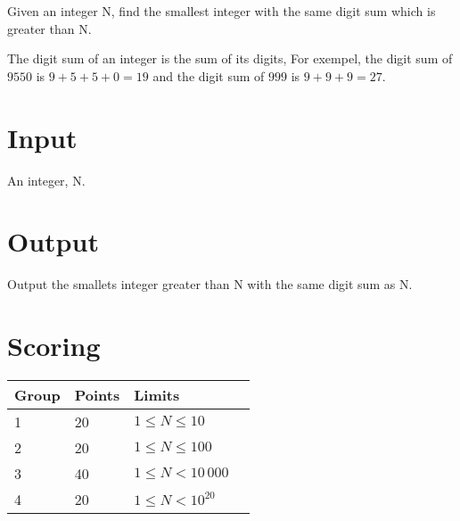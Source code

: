 
Given an integer N, find the smallest integer with the same digit sum which is greater than N.

The digit sum of an integer is the sum of its digits, For exempel, the digit sum of $9550$ is $9 + 5 + 5 + 0 = 19$ and the digit sum of $999$ is $9 + 9 + 9 = 27$.

\section*{Input}
An integer, N.

\section*{Output}
Output the smallets integer greater than N with the same digit sum as N.

\section*{Scoring}

\begin{tabular}{| l | l | l | l |}
\hline
Group & Points     & Limits \\ \hline
1     & 20         & $1 \le N \le 10$ \\ \hline	
2     & 20         & $1 \le N \le 100$ \\ \hline	
3     & 40         & $1 \le N < 10\,000$ \\ \hline	
4     & 20         & $1 \le N < 10^{20}$ \\ \hline	
\end{tabular}

